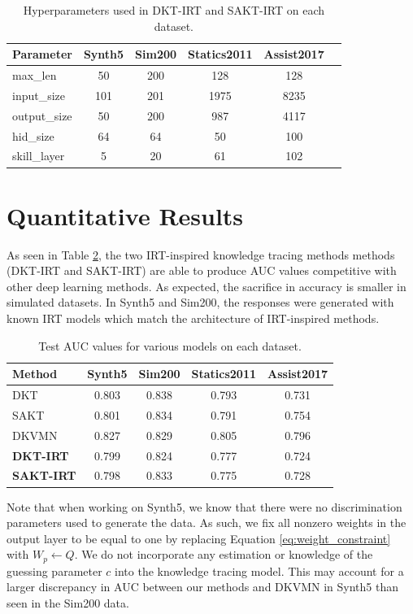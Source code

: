 \begin{table}
  \centering
  \begin{tabular}{l c c c c c}
    \hline
    Parameter & Synth5 & Sim200 & Statics2011 & Assist2017 \\
    \hline
    max\_len & 50 & 200 & 128 & 128 \\
    input\_size & 101 & 201 & 1975 & 8235 \\
    output\_size & 50 & 200 & 987 & 4117 \\
    hid\_size & 64 & 64 & 50 & 100 \\
    skill\_layer & 5 & 20 & 61 & 102 
  \end{tabular}
  \caption{Hyperparameters used in DKT-IRT and SAKT-IRT on each dataset.}
  \label{tab:kt_params}
\end{table}

\section{Quantitative Results} \label{sec:kt_results}

As seen in Table \ref{tab:kt_results}, the two IRT-inspired knowledge tracing methods methods (DKT-IRT and SAKT-IRT) are able to produce AUC values competitive with other deep learning methods. As expected, the sacrifice in accuracy is smaller in simulated datasets. In Synth5 and Sim200, the responses were generated with known IRT models which match the architecture of IRT-inspired methods. 

\begin{table}
  \centering
  \begin{tabular}{l c c c c}
    \hline
    Method & Synth5 & Sim200 & Statics2011 & Assist2017 \\
    \hline 
    DKT & 0.803 & 0.838 & 0.793 & 0.731 \\
    SAKT & 0.801 & 0.834 & 0.791  & 0.754 \\
    DKVMN & 0.827 & 0.829 & 0.805 & 0.796 \\
    \textbf{DKT-IRT} & 0.799 & 0.824 & 0.777 & 0.724 \\
    \textbf{SAKT-IRT} & 0.798 & 0.833 & 0.775 & 0.728
  \end{tabular}
  \caption{Test AUC values for various models on each dataset.}
  \label{tab:kt_results}
\end{table}

Note that when working on Synth5, we know that there were no discrimination parameters used to generate the data. As such, we fix all nonzero weights in the output layer to be equal to one by replacing Equation \ref{eq:weight_constraint} with $W_p \gets Q$. We do not incorporate any estimation or knowledge of the guessing parameter $c$ into the knowledge tracing model. This may account for a larger discrepancy in AUC between our methods and DKVMN in Synth5 than seen in the Sim200 data.

